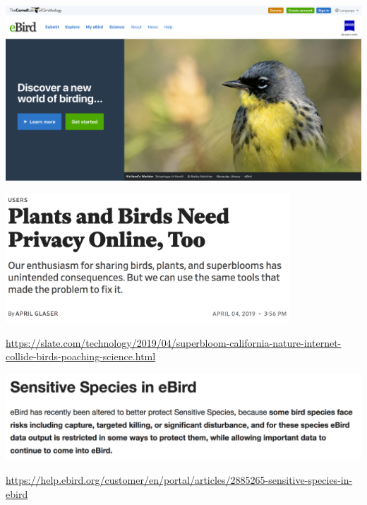 \documentclass{beamer}
\begin{document}
\begin{frame}

\begin{center}
\includegraphics[width=\textwidth]{figures/ebird_screenshot}
\end{center}

\end{frame}
\begin{frame}

\begin{center}
\includegraphics[width=0.8\textwidth]{figures/glaser_plants_2019_title}
\end{center}

\vfill
\url{https://slate.com/technology/2019/04/superbloom-california-nature-internet-collide-birds-poaching-science.html}
\end{frame}
\begin{frame}

\begin{center}
\includegraphics[width=\textwidth]{figures/ebird_sensitive_species}
\end{center}

\vfill
\url{https://help.ebird.org/customer/en/portal/articles/2885265-sensitive-species-in-ebird}
\end{frame}
\end{document}
